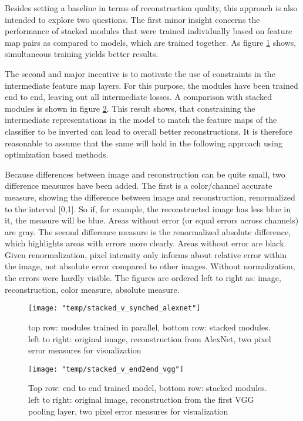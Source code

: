 \documentclass{article}
\begin{document}
Besides setting a baseline in terms of reconstruction quality, this approach is also intended to explore two questions. The first minor insight concerns the performance of stacked modules that were trained individually based on feature map pairs as compared to models, which are trained together. As figure \ref{fig:stack_v_sync} shows, simultaneous training yields better results. 

The second and major incentive is to motivate the use of constraints in the intermediate feature map layers. For this purpose, the modules have been trained end to end, leaving out all intermediate losses. A comparison with stacked modules is shown in figure \ref{fig:stack_v_end2end}. This result shows, that constraining the intermediate representations in the model to match the feature maps of the classifier to be inverted can lead to overall better reconstructions. It is therefore reasonable to assume that the same will hold in the following approach using optimization based methods.

Because differences between image and reconstruction can be quite small, two difference measures have been added. The first is a color/channel accurate measure, showing the difference between image and reconstruction, renormalized to the interval [0,1]. So if, for example, the reconstructed image has less blue in it, the measure will be blue. Areas without error (or equal errors across channels) are gray. The second difference measure is the renormalized absolute difference, which highlights areas with errors more clearly. Areas without error are black. Given renormalization,  pixel intensity only informs about relative error within the image, not absolute error compared to other images. Without normalization, the errors were hardly visible. The figures are ordered left to right as: image, reconstruction, color measure, absolute measure. 



\begin{figure}
	\centering
	\texttt{[image: "temp/stacked\_v\_synched\_alexnet"]}
	\caption{top row: modules trained in parallel, bottom row: stacked modules.
		left to right: original image, reconstruction from AlexNet, two pixel error measures for visualization}
	\label{fig:stack_v_sync}
\end{figure}

\begin{figure}
	\centering
	\texttt{[image: "temp/stacked\_v\_end2end\_vgg"]}
	\caption{Top row: end to end trained model, bottom row: stacked modules. 
		left to right: original image, reconstruction from the first VGG pooling layer, two pixel error measures for visualization}
	\label{fig:stack_v_end2end}
\end{figure}
\end{document}
